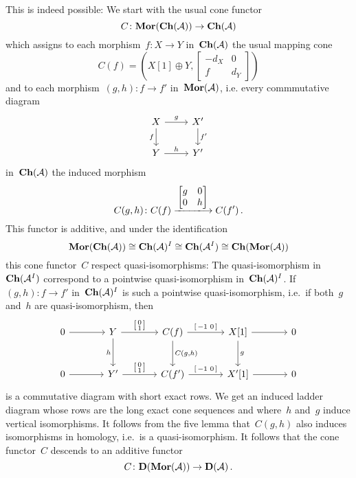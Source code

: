 \documentclass[a4paper,10pt]{scrartcl}
\begin{document}
This is indeed possible:
We start with the usual cone functor
\[
  C
  \colon
  \mathbf{Mor}(\mathbf{Ch}(\mathcal{A}))
  \to
  \mathbf{Ch}(\mathcal{A})
\]
which assigns to each morphism~$f \colon X \to Y$ in~$\mathbf{Ch}(\mathcal{A})$ the usual mapping cone
\[
  C(f)
  =
  \left(
    X[1] \oplus Y,
    \begin{bmatrix}
      -d_X & 0   \\
        f   & d_Y
    \end{bmatrix}
  \right)
\]
and to each morphism~$(g,h) \colon f \to f'$ in~$\mathbf{Mor}(\mathcal{A})$, i.e. every commmutative diagram
\[
  \begin{tikzcd}
    X
    \arrow{r}[above]{g}
    \arrow{d}[left]{f}
    &
    X'
    \arrow{d}[right]{f'}
    \\
    Y
    \arrow{r}[above]{h}
    &
    Y'
  \end{tikzcd}
\]
in~$\mathbf{Ch}(\mathcal{A})$ the induced morphism
\[
  C(g,h)
  \colon
  C(f)
  \xlongto{ \begin{bmatrix} g & 0 \\ 0 & h \end{bmatrix} }
  C(f') \,.
\]
This functor is additive, and under the identification
\[
  \mathbf{Mor}(\mathbf{Ch}(\mathcal{A}))
  \cong
  \mathbf{Ch}(\mathcal{A})^I
  \cong
  \mathbf{Ch}(\mathcal{A}^I)
  \cong
  \mathbf{Ch}(\mathbf{Mor}(\mathcal{A}))
\]
this cone functor~$C$ respect quasi-isomorphisms:
The quasi-isomorphism in~$\mathbf{Ch}(\mathcal{A}^I)$ correspond to a pointwise quasi-isomorphism in~$\mathbf{Ch}(\mathcal{A})^I$.
If~$(g,h) \colon f \to f'$ in~$\mathbf{Ch}(\mathcal{A})^I$ is such a pointwise quasi-isomorphism, i.e.\ if both~$g$ and~$h$ are quasi-isomorphism, then
\[
  \begin{tikzcd}[sep = large, ampersand replacement = \&]
    0
    \arrow{r}
    \&
    Y
    \arrow{r}[above]{\begin{bsmallmatrix} 0 \\ 1 \end{bsmallmatrix}}
    \arrow{d}[left]{h}
    \&
    C(f)
    \arrow{r}[above]{\begin{bsmallmatrix} -1 & 0 \end{bsmallmatrix}}
    \arrow{d}[right]{C(g,h)}
    \&
    X[1]
    \arrow{r}
    \arrow{d}[right]{g}
    \&
    0
    \\
    0
    \arrow{r}
    \&
    Y'
    \arrow{r}[above]{\begin{bsmallmatrix} 0 \\ 1 \end{bsmallmatrix}}
    \&
    C(f')
    \arrow{r}[above]{\begin{bsmallmatrix} -1 & 0 \end{bsmallmatrix}}
    \&
    X'[1]
    \arrow{r}
    \&
    0
  \end{tikzcd}
\]
is a commutative diagram with short exact rows.
We get an induced ladder diagram whose rows are the long exact cone sequences and where~$h$ and~$g$ induce vertical isomorphisms.
It follows from the five lemma that~$C(g,h)$ also induces isomorphisms in homology, i.e.\ is a quasi-isomorphism.
It follows that the cone functor~$C$ descends to an additive functor
\[
  C
  \colon
  \mathbf{D}( \mathbf{Mor}(\mathcal{A}) )
  \to
  \mathbf{D}( \mathcal{A} ) \,.
\]
\end{document}
